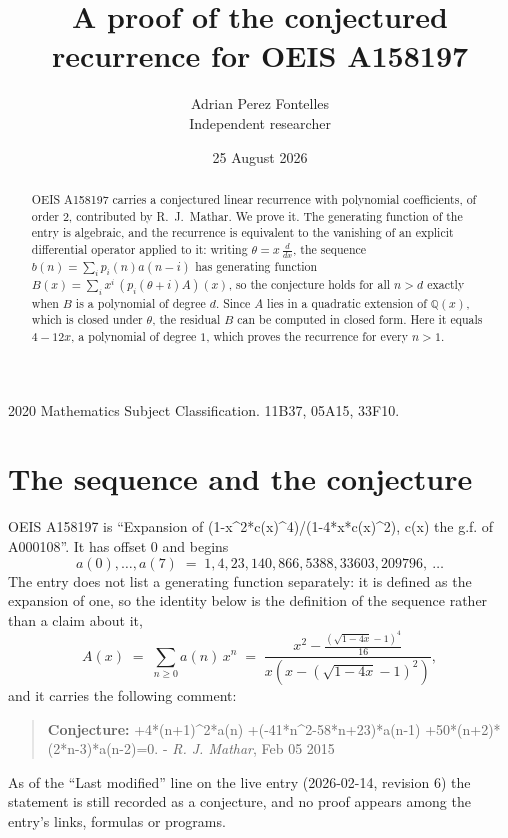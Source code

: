\documentclass[11pt,a4paper]{article}
\title{A proof of the conjectured recurrence for OEIS A158197}
\author{Adrian Perez Fontelles\\ \small Independent researcher}
\date{25 August 2026}
\theoremstyle{plain}
\theoremstyle{definition}
\begin{document}
\maketitle

\begin{abstract}
OEIS A158197 carries a conjectured linear recurrence with polynomial coefficients, of
order 2, contributed by R.~J.~Mathar. We prove it. The generating function of the
entry is algebraic, and the recurrence is equivalent to the vanishing of an explicit
differential operator applied to it: writing $\theta=x\,\frac{d}{dx}$, the sequence
$b(n)=\sum_{i}p_{i}(n)a(n-i)$ has generating function
$B(x)=\sum_{i}x^{i}\,(p_{i}(\theta+i)A)(x)$, so the conjecture holds for all $n>d$ exactly
when $B$ is a polynomial of degree $d$. Since $A$ lies in a quadratic extension of
$\mathbb{Q}(x)$, which is closed under $\theta$, the residual $B$ can be computed in
closed form. Here it equals $4 - 12 x$, a polynomial of degree $1$, which proves
the recurrence for every $n>1$.
\end{abstract}

\noindent\small 2020 Mathematics Subject Classification. 11B37, 05A15, 33F10.\normalsize

\section{The sequence and the conjecture}

OEIS A158197 is ``Expansion of (1-x\^{}2*c(x)\^{}4)/(1-4*x*c(x)\^{}2), c(x) the g.f. of A000108''. It has offset $0$ and begins
\[
a(0),\dots,a(7)\;=\;1, 4, 23, 140, 866, 5388, 33603, 209796,\ \dots
\]
The entry does not list a generating function separately: it is defined as the
expansion of one, so the identity below is the definition of the sequence rather than a
claim about it,
\begin{equation}\label{eq:gf}
A(x)\;=\;\sum_{n\ge 0} a(n)\,x^{n}\;=\;\frac{x^{2} - \frac{\left(\sqrt{1 - 4 x} - 1\right)^{4}}{16}}{x \left(x - \left(\sqrt{1 - 4 x} - 1\right)^{2}\right)} ,
\end{equation}
and it carries the following comment:
\begin{quote}\small
\textbf{Conjecture:} +4*(n+1)\^{}2*a(n) +(-41*n\^{}2-58*n+23)*a(n-1) +50*(n+2)*(2*n-3)*a(n-2)=0. - \emph{R. J. Mathar}, Feb 05 2015
\end{quote}
As of the ``Last modified'' line on the live entry (2026-02-14, revision 6) the
statement is still recorded as a conjecture, and no proof appears among the entry's links,
formulas or programs.
\end{document}
